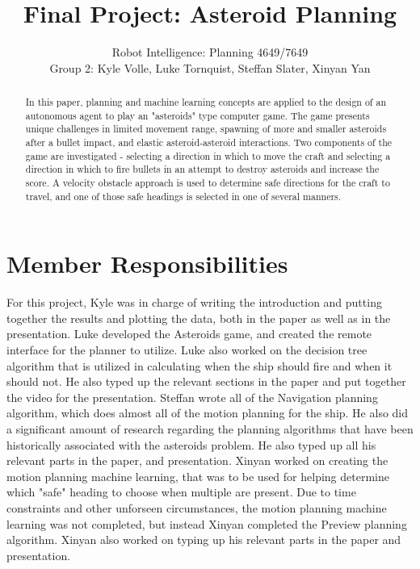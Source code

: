 \documentclass[10pt,final,conference]{article}
\begin{document}
\title{Final Project: Asteroid Planning}
\author{Robot Intelligence: Planning 4649/7649 \\
Group 2: Kyle Volle, Luke Tornquist, Steffan Slater, Xinyan Yan}
\maketitle


\newpage

\nocite{*}

\begin{abstract}
In this paper, planning and machine learning concepts are applied to the design of an autonomous agent to play an "asteroids" type computer game. The game presents unique challenges in limited movement range, spawning of more and smaller asteroids after a bullet impact, and elastic asteroid-asteroid interactions. Two components of the game are investigated - selecting a direction in which to move the craft and selecting a direction in which to fire bullets in an attempt to destroy asteroids and increase the score. A velocity obstacle approach is used to determine safe directions for the craft to travel, and one of those safe headings is selected in one of several manners.
\end{abstract}

\section{Member Responsibilities}
For this project, Kyle was in charge of writing the introduction and putting together the results and plotting the data, both in the paper as well as in the presentation.  Luke developed the Asteroids game, and created the remote interface for the planner to utilize.  Luke also worked on the decision tree algorithm that is utilized in calculating when the ship should fire and when it should not.  He also typed up the relevant sections in the paper and put together the video for the presentation.  Steffan wrote all of the Navigation planning algorithm, which does almost all of the motion planning for the ship.  He also did a significant amount of research regarding the planning algorithms that have been historically associated with the asteroids problem.  He also typed up all his relevant parts in the paper, and presentation.  Xinyan worked on creating the motion planning machine learning, that was to be used for helping determine which "safe" heading to choose when multiple are present.  Due to time constraints and other unforseen circumstances, the motion planning machine learning was not completed, but instead Xinyan completed the Preview planning algorithm.  Xinyan also worked on typing up his relevant parts in the paper and presentation.
\end{document}
